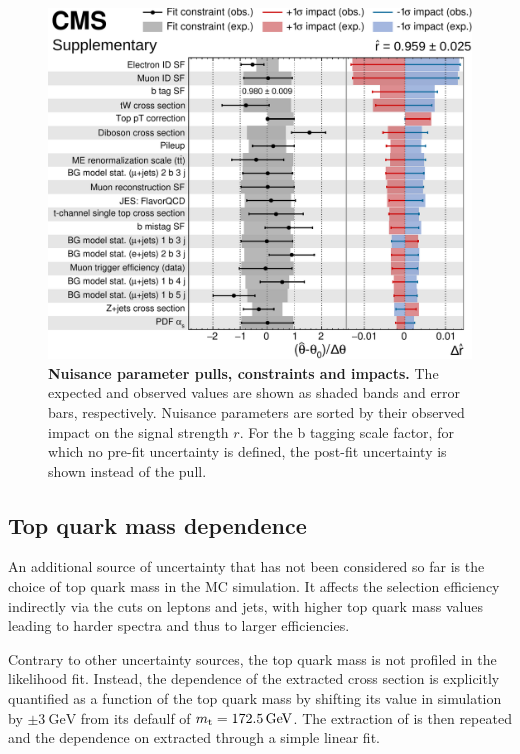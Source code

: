 \begin{figure}[!ht]
    \centering
    \includegraphics[width=0.9\linewidth]{figures/ttxs/impacts_v2.pdf}
    \caption{\textbf{Nuisance parameter pulls, constraints and impacts.} The expected and observed values are shown as shaded bands and error bars, respectively. Nuisance parameters are sorted by their observed impact on the signal strength $r$. For the b tagging scale factor, for which no pre-fit uncertainty is defined, the post-fit uncertainty is shown instead of the pull.}
    \label{fig:ttxs:impacts}
\end{figure}



\subsection{Top quark mass dependence}
\label{sec:ttxs:topmass}

An additional source of uncertainty that has not been considered so far is the choice of top quark mass in the \ttbar MC simulation. It affects the selection efficiency indirectly via the \pt cuts on leptons and jets, with higher top quark mass values leading to harder spectra and thus to larger efficiencies.

Contrary to other uncertainty sources, the top quark mass is not profiled in the likelihood fit. Instead, the dependence of the extracted \ttbar cross section is explicitly quantified as a function of the top quark mass by shifting its value in simulation by $\pm \SI{3}{\GeV}$ from its defaulf of $\mt = \SI{172.5}{\GeV}$.
The extraction of \sigmatt is then repeated and the dependence on \mt extracted through a simple linear fit.

